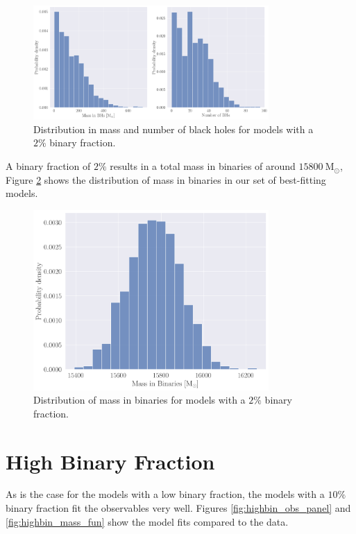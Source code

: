 \begin{figure}
	\centering
	\includegraphics[width=0.8\textwidth]{figures/low_bin_model/BH_dists.png}
	\caption{Distribution in mass and number of black holes for models with a $2\%$ binary fraction.}
	\label{fig:low_bin_model_BH_dists}
\end{figure}


A binary fraction of $2\%$ results in a total mass in binaries of around $15800 \ \mathrm{M}_\odot$,
Figure \ref{fig:low_bin_model_Bin_mass} shows the distribution of mass in binaries in our set of
best-fitting models.


\begin{figure}
	\centering
	\includegraphics[width=0.8\textwidth]{figures/low_bin_model/binary_mass.png}
	\caption{Distribution of mass in binaries for models with a $2\%$ binary fraction.}
	\label{fig:low_bin_model_Bin_mass}
\end{figure}


\section{High Binary Fraction}

As is the case for the models with a low binary fraction, the models with a $10\%$ binary
fraction fit the observables very well. Figures \ref{fig:highbin_obs_panel} and
\ref{fig:highbin_mass_fun} show the model fits compared to the data.

